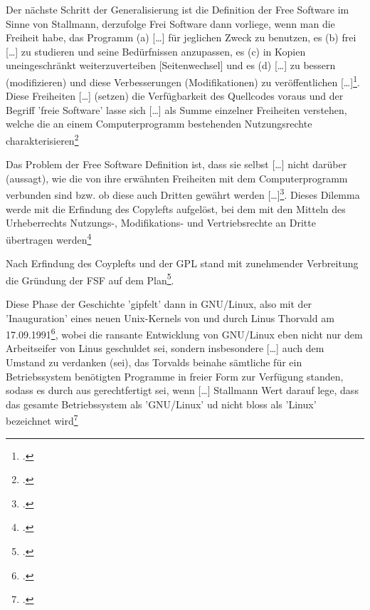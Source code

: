 \documentclass[DIV=calc,BCOR=5mm,11pt,headings=small,oneside,abstract=true, toc=bib]{scrartcl}
\begin{document}
Der nächste Schritt der Generalisierung ist die Definition der Free Software im
Sinne von Stallmann, derzufolge Frei Software dann vorliege, wenn man die
Freiheit habe, das Programm (a) \glqq{}[\ldots] für jeglichen Zweck zu
benutzen\grqq{}, es (b) frei \glqq{}[\ldots] zu studieren und seine
Bedürfnissen anzupassen\grqq{}, es (c) in Kopien uneingeschränkt
\glqq{}weiterzuverteiben\grqq{} [Seitenwechsel] und es (d) \glqq{}[\ldots] zu
bessern (modifizieren) und diese Verbesserungen (Modifikationen) zu
veröffentlichen [\ldots]\grqq{}\footcite[vgl.][14f]{Widmer2003a}. Diese
Freiheiten \glqq{}[\ldots] (setzen) die Verfügbarkeit des Quellcodes
voraus\grqq{} und der Begriff 'freie Software' lasse sich \glqq{}[\ldots]
als Summe einzelner Freiheiten verstehen, welche die an einem
Computerprogramm bestehenden Nutzungsrechte
charakterisieren\grqq{}\footcite[vgl.][15 Widmer selbst sagt, dass
nur die ersten drei Freiheiten den Quellcode voraussetzen. Ich
meine, dass das insbesondere auch für die Modifikation gilt: nur
der Code macht praktisch die Verbesserung möglich]{Widmer2003a}

Das Problem der \glqq{}Free Software Definition\grqq{} ist, dass sie selbst
\glqq{}[\ldots] nicht darüber (aussagt), wie die von ihre erwähnten Freiheiten
mit dem Computerprogramm verbunden sind bzw. ob diese auch Dritten gewährt
werden [\ldots]\grqq{}\footcite[vgl.][15]{Widmer2003a}. Dieses Dilemma werde mit
die Erfindung des \glqq{}Copylefts\grqq{} aufgelöst, bei dem mit den Mitteln des
Urheberrechts Nutzungs-, Modifikations- und Vertriebsrechte an Dritte übertragen
werden\footcite[vgl.][16 Referiert Stallmann, what is copyleft
http://www.fsf.org/licenses/licenses.html\#WhatIsCopyleft]{Widmer2003a}

Nach Erfindung des Coyplefts und der GPL stand mit zunehmender Verbreitung die
Gründung der FSF auf dem Plan\footcite[vgl.][16f]{Widmer2003a}.

Diese Phase der Geschichte 'gipfelt' dann in \glqq{}GNU/Linux\grqq{}, also mit
der 'Inauguration' eines neuen Unix-Kernels von und durch Linus Thorvald am
17.09.1991\footcite[vgl.][17]{Widmer2003a}, wobei \glqq{}die ransante
Entwicklung von GNU/Linux\grqq{} eben nicht nur dem Arbeitseifer von Linus
geschuldet sei, sondern insbesondere \glqq{}[\ldots] auch dem Umstand zu
verdanken (sei), das Torvalds beinahe sämtliche für ein Betriebssystem
benötigten Programme in freier Form zur Verfügung standen\grqq{}, sodass es
durch aus gerechtfertigt sei, wenn \glqq{}[\ldots] Stallmann Wert darauf lege,
dass das gesamte Betriebssystem als 'GNU/Linux' ud nicht bloss als 'Linux'
bezeichnet wird\grqq{}\footcite[vgl.][18]{Widmer2003a}
\end{document}
